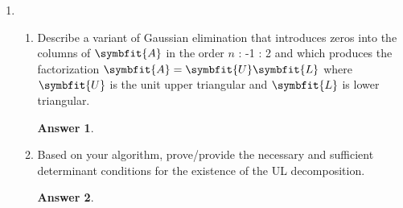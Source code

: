 \documentclass{article}
\theoremstyle{definition}
\newtheorem*{answer}{Answer}
\newcommand{\mat}[1]{\symbfit{#1}}
\begin{document}
\begin{enumerate}[leftmargin=\labelsep]
\begin{proof}
\begin{align*}
			                              & = \mat{A}^{\top} \mat{A} \qty(\qty(\mat{A}^{\top}\mat{A})^{-1})^{\top}             \\
			                              & = \mat{A}^{\top} \mat{A} \qty(\qty(\mat{A}^{\top}\mat{A})^{\top})^{-1}             \\
			                              & = \cancel{\qty(\mat{A}^{\top} \mat{A})} \cancel{\qty(\mat{A}^{\top} \mat{A})^{-1}} \\
			                              & = \mat{I},
		      \end{align*}
		      so \(\mat{A}^+\mat{A}= (\mat{A}^+\mat{A})^\top\).
		      Finally,
		      \begin{align*}
			      (\mat{A}\mat{A}^+)^\top & = \qty(\mat{A}^+)^{\top}\mat{A}^\top                                  \\
			                              & = (\qty(\mat{A}^{\top}\mat{A})^{-1}\mat{A}^{\top})^{\top}\mat{A}^\top \\
			                              & = \mat{A}\qty(\qty(\mat{A}^{\top}\mat{A})^{-1})^{\top}\mat{A}^\top    \\
			                              & = \mat{A}\qty(\qty(\mat{A}^{\top}\mat{A})^{\top})^{-1}\mat{A}^\top    \\
			                              & = \mat{A}\qty(\mat{A}^{\top}\mat{A})^{-1}\mat{A}^\top                 \\
			                              & =\mat{A}\mat{A}^+.
		      \end{align*}
	      \end{proof}

	\item
	      \begin{enumerate}
		      \item Describe a variant of Gaussian elimination that introduces zeros into the columns of \(\mat{A}\) in the order \(n\) : -1 : 2 and which produces the factorization \(\mat{A} = \mat{U}\mat{L}\) where \(\mat{U}\) is the unit upper triangular and \(\mat{L}\) is lower triangular.
		            \begin{answer}
		            \end{answer}

		      \item Based on your algorithm, prove/provide the necessary and sufficient determinant conditions for the existence of the UL decomposition.
		            \begin{answer}
		            \end{answer}


\end{enumerate}
\end{enumerate}
\end{document}

